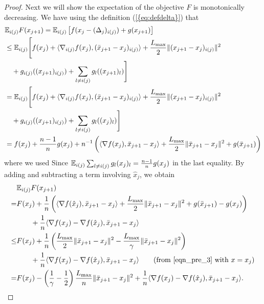 \documentclass{siamltex}
\begin{document}
\begin{proof}
Next we will show the expectation of the objective $F$ is
monotonically decreasing. We have using the definition
{(\ref{{eq:defdelta}})} that
\begin{align}
\nonumber
&{\mathbb{E}}_{i(j)}  F(x_{j+1}) = {\mathbb{E}}_{i(j)} \left[f(x_j - (\Delta_j)_{i(j)}) + g(x_{j+1})\right]\\
\nonumber
&\leq {\mathbb{E}}_{i(j)}\Bigg[f(x_j) + \langle \nabla_{i(j)}f(x_j), (\bar{x}_{j+1}-x_j)_{i(j)} \rangle + \frac{L_{\mbox{\rm\scriptsize max}}}{2}\|(x_{j+1}-x_j)_{i(j)}\|^2 \\
\nonumber
& \quad + g_{i(j)}((x_{j+1})_{i(j)})  + \sum_{l\neq i(j)} g_l((x_{j+1})_l)\Bigg] \\
\nonumber
& = {\mathbb{E}}_{i(j)}\Bigg[f(x_j) + \langle \nabla_{i(j)}f(x_j), (\bar{x}_{j+1}-x_j)_{i(j)} \rangle + \frac{L_{\mbox{\rm\scriptsize max}}}{2}\|(x_{j+1}-x_j)_{i(j)}\|^2 \\
\nonumber 
& \quad+ g_{i(j)}((x_{j+1})_{i(j)})  + \sum_{l\neq i(j)} g_l((x_{j})_l)\Bigg] \\
\nonumber
& = f(x_j)+ {n-1\over n}g(x_j)
+n^{-1}\left( \langle \nabla f(x_j), \bar{x}_{j+1}-x_j \rangle + \frac{L_{\mbox{\rm\scriptsize max}}}{2}\|\bar{x}_{j+1}-x_j\|^2+g(\bar{x}_{j+1})\right)
\end{align}
where we used Since ${\mathbb{E}}_{i(j)}\sum_{l\neq i(j)}g_l(x_j)_l={n-1\over
  n}g(x_j)$ in the last equality. By adding and subtracting a term
involving $\hat{x}_j$, we obtain
\begin{align}
\nonumber
&{\mathbb{E}}_{i(j)} F(x_{j+1}) 
\\ \nonumber
=& 
F(x_j)+{1\over n}\left(\langle \nabla f({\hat{x}}_{j}), \bar{x}_{j+1}-x_j \rangle + \frac{L_{\mbox{\rm\scriptsize max}}}{2}\|\bar{x}_{j+1}-x_j\|^2 + g(\bar{x}_{j+1}) - g(x_j) \right) \\
\nonumber
&\quad\quad+{1\over n} \langle \nabla f(x_j)- \nabla f({\hat{x}}_{j}), \bar{x}_{j+1}-x_j\rangle \\
\nonumber
\leq & F(x_j)+ {1\over n}\left(\frac{L_{\mbox{\rm\scriptsize max}}}{2}\|\bar{x}_{j+1}-x_j\|^2  - {{L_{\mbox{\rm\scriptsize max}}}\over \gamma}\|\bar{x}_{j+1}-x_j\|^2\right) \\
\nonumber
&\quad\quad+ {1\over n} \langle \nabla f(x_j)- \nabla f({\hat{x}}_{j}), \bar{x}_{j+1}-x_j\rangle \quad\quad (\text{from \eqref{eqn_pre_3} with $x=x_j$})
\\
=& F(x_j)-  \left({\frac{1}{\gamma}-\frac{1}{2}}\right)\frac{L_{\mbox{\rm\scriptsize max}}}{n}\|\bar{x}_{j+1}-x_j\|^2 +  {1\over n}\langle \nabla f(x_j)- \nabla f({\hat{x}}_{j}), \bar{x}_{j+1}-x_j\rangle.

\end{align}
\end{proof}
\end{document}
